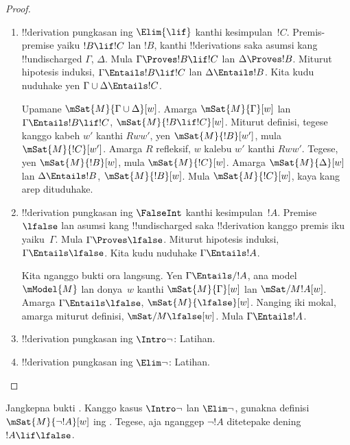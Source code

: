 \documentclass[../../../include/open-logic-section]{subfiles}
\begin{document}
\begin{proof}
\begin{enumerate}
    Upamane $\mSat{M}{\Gamma}[w]$. Kita arep nuduhake yen kanggo kabeh
    $w'$ kanthi $Rww'$, yen $\mSat{M}{!B}[w']$, mula
    $\mSat{M}{!C}[w']$. Mula upamane $Rww'$ lan
    $\mSat{M}{!B}[w']$. Miturut ,
    $\mSat{M}{\Gamma}[w']$. Amarga $\Gamma \cup \{!B\} \Entails !C$,
    $\mSat{M}{!C}[w']$, kaya kang arep dituduhake.

  \item !!{derivation} pungkasan ing $\Elim{\lif}$ kanthi
    kesimpulan~$!C$. Premis-premise yaiku $!B \lif !C$ lan $!B$,
    kanthi !!{derivation}s saka asumsi kang !!{undischarged} $\Gamma$,
    $\Delta$. Mula $\Gamma \Proves !B \lif !C$ lan $\Delta \Proves !B$.
    Miturut hipotesis induksi, $\Gamma \Entails !B \lif !C$ lan
    $\Delta \Entails !B$. Kita kudu nuduhake yen
    $\Gamma \cup \Delta \Entails !C$.

    Upamane $\mSat{M}{\Gamma \cup \Delta}[w]$. Amarga
    $\mSat{M}{\Gamma}[w]$ lan $\Gamma \Entails !B \lif !C$,
    $\mSat{M}{!B \lif !C}[w]$. Miturut definisi, tegese kanggo kabeh
    $w'$ kanthi $Rww'$, yen $\mSat{M}{!B}[w']$, mula
    $\mSat{M}{!C}[w']$. Amarga $R$ refleksif, $w$ kalebu $w'$
    kanthi $Rww'$. Tegese, yen $\mSat{M}{!B}[w]$, mula
    $\mSat{M}{!C}[w]$. Amarga $\mSat{M}{\Delta}[w]$ lan
    $\Delta \Entails !B$, $\mSat{M}{!B}[w]$. Mula $\mSat{M}{!C}[w]$,
    kaya kang arep dituduhake.

  \item !!{derivation} pungkasan ing $\FalseInt$ kanthi kesimpulan~$!A$.
    Premise $\lfalse$ lan asumsi kang !!{undischarged} saka
    !!{derivation} kanggo premis iku yaiku~$\Gamma$. Mula
    $\Gamma \Proves \lfalse$. Miturut hipotesis induksi,
    $\Gamma \Entails \lfalse$. Kita kudu nuduhake $\Gamma \Entails !A$.

    Kita nganggo bukti ora langsung. Yen $\Gamma \Entails/ !A$, ana
    model~$\mModel{M}$ lan donya~$w$ kanthi $\mSat{M}{\Gamma}[w]$
    lan $\mSat/{M}{!A}[w]$. Amarga $\Gamma \Entails \lfalse$,
    $\mSat{M}{\lfalse}[w]$. Nanging iki mokal, amarga miturut
    definisi, $\mSat/{M}{\lfalse}[w]$. Mula $\Gamma \Entails !A$.
  \item !!{derivation} pungkasan ing $\Intro\lnot$: Latihan.
  \item !!{derivation} pungkasan ing $\Elim\lnot$: Latihan.
  \end{enumerate}
\end{proof}

\begin{prob}
  Jangkepna bukti . Kanggo kasus
  $\Intro\lnot$ lan $\Elim\lnot$, gunakna definisi
  $\mSat{M}{\lnot !A}[w]$ ing .
  Tegese, aja nganggep $\lnot !A$ ditetepake dening $!A \lif \lfalse$.
\end{prob}
\end{document}
